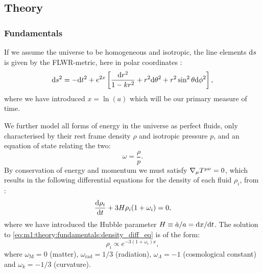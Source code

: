 \subsection{Theory}\label{sec:m1:theory}

\subsubsection{Fundamentals}\label{sec:m1:theory:fundamentals}

    If we assume the universe to be homogeneous and isotropic, the line elements $\mathrm{d} s$ is given by the FLWR-metric, here in polar coordinates \cite[eq. 1.1.11]{weinberg2008cosmology}:
    \begin{equation}\label{eq:m1:theory:fundamentals:FLWR_line_element}
        \mathrm{d} s^2 = -\mathrm{d} t^2 + e^{2x}\left[ \frac{\mathrm{d} r^2}{1-kr^2}+r^2\mathrm{d}\theta^2 + r^2\sin^2\theta\mathrm{d}\phi^2 \right],
    \end{equation}
    where we have introduced $x = \ln(a)$ which will be our primary measure of time. 

    We further model all forms of energy in the universe as perfect fluids, only characterised by their rest frame density $\rho$ and isotropic pressure $p$, and an equation of state relating the two:
    \begin{equation}\label{eq:m1:theory:fundamentals:equation_of_state}
        \omega=\frac{\rho}{p}.
    \end{equation}
    By conservation of energy and momentum we must satisfy $\nabla_\mu T^{\mu\nu}=0$, which results in the following differential equations for the density of each fluid $\rho_i$, from \cite{AST5220LectureNotes}:
    \begin{equation}\label{eq:m1:theory:fundamentals:density_diff_eq}
        \dv{\rho_i}{t} +3H\rho_i(1+\omega_i) = 0,
    \end{equation}
    where we have introduced the Hubble parameter $H \equiv\dot{a}/a=\mathrm{d} x/\mathrm{d} t$. The solution to \cref{eq:m1:theory:fundamentals:density_diff_eq} is of the form:
    \begin{equation}\label{eq:m1:theory:fundamentals:solution_to_density_diff_eq}
        \rho_i \propto e^{-3(1+\omega_i)x},
    \end{equation}
    where $\omega_\mathrm{M} = 0$ (matter), $\omega_\mathrm{rad}=1/3$ (radiation), $\omega_\Lambda=-1$ (cosmological constant) and $\omega_k=-1/3$ (curvature). 

